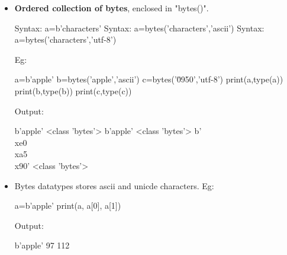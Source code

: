 
\begin{flushleft}
	\begin{itemize}
		\item \textbf{Ordered collection of bytes}, enclosed in "bytes()".
		\begin{tcolorbox}[breakable,notitle,boxrule=1pt,colback=pink,colframe=pink]
			\color{black}
			\font=8pt
			Syntax: a=b'characters'
			\newline
			Syntax: a=bytes('characters','ascii')
			\newline
			Syntax: a=bytes('characters','utf-8')
			\font=4pt
		\end{tcolorbox}
		
		Eg:	
		\begin{tcolorbox}[breakable,notitle,boxrule=-0pt,colback=code,colframe=code]
			\color{white}
			\font=8pt
			a=b'apple'
			\newline
			b=bytes('apple','ascii')
			\newline
			c=bytes('\u0950','utf-8')
			\newline
			print(a,type(a))
			\newline
			print(b,type(b))
			\newline
			print(c,type(c))
			\font=4pt
		\end{tcolorbox}
		
		Output:
		\begin{tcolorbox}[breakable,notitle,boxrule=-0pt,colback=output,colframe=output]
			\color{black}
			b'apple' <class 'bytes'>\newline
			b'apple' <class 'bytes'>\newline
			b'\\xe0\\xa5\\x90' <class 'bytes'>
			\font=4pt
		\end{tcolorbox}
		
		\bigskip
		
		\item Bytes datatypes stores ascii and unicde characters.
		\newline
		Eg:			
		\begin{tcolorbox}[breakable,notitle,boxrule=-0pt,colback=code,colframe=code]
			\color{white}
			\font=8pt
			a=b'apple' \newline
			print(a, a[0], a[1])
			\font=4pt
		\end{tcolorbox}

		Output:
		\begin{tcolorbox}[breakable,notitle,boxrule=-0pt,colback=output,colframe=output]
			\color{black}
			b'apple' 97 112
			\font=4pt
		\end{tcolorbox}
		

\end{itemize}
\end{flushleft}

